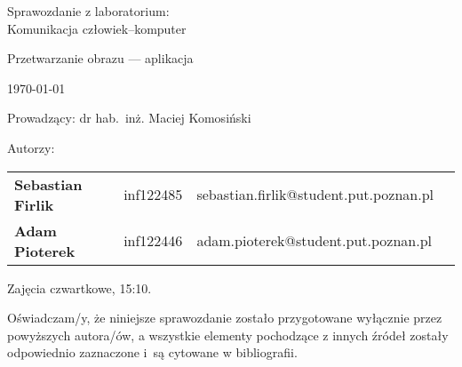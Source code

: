 \thispagestyle{empty} %

\begin{center}
{\large{Sprawozdanie z laboratorium:\\
Komunikacja człowiek–komputer}}

\vspace{3ex}

Przetwarzanie obrazu — aplikacja

\vspace{3ex}
{\footnotesize\today}

\end{center}


\vspace{10ex}

Prowadzący: dr hab.~inż. Maciej Komosiński

\vspace{5ex}

Autorzy:
\begin{tabular}{lllr}
\textbf{Sebastian Firlik} & inf122485 & sebastian.firlik@student.put.poznan.pl \\
\textbf{Adam Pioterek} & inf122446 & adam.pioterek@student.put.poznan.pl \\
\end{tabular}

\vspace{5ex}

Zajęcia czwartkowe, 15:10.

\vspace{35ex}

\noindent Oświadczam/y, że niniejsze sprawozdanie zostało przygotowane wyłącznie przez powyższych autora/ów,
a wszystkie elementy pochodzące z innych źródeł zostały odpowiednio zaznaczone i~są cytowane w bibliografii.  

\newpage

